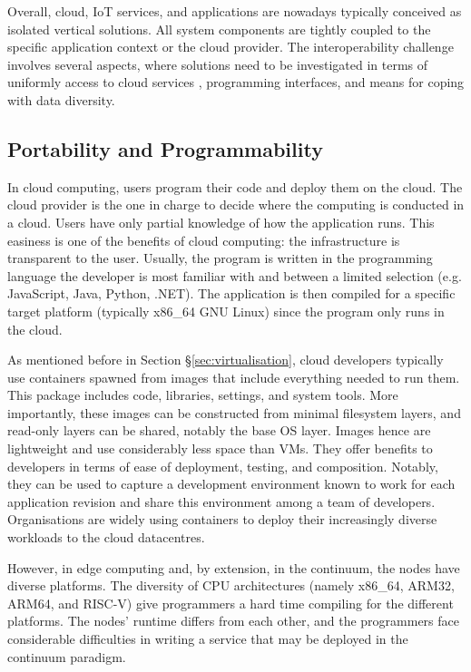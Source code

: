 Overall, cloud, IoT services, and applications are nowadays typically conceived as isolated vertical solutions. All system components are tightly coupled to the specific application context or the cloud provider. The interoperability challenge involves several aspects, where solutions need to be investigated in terms of uniformly access to cloud services \cite{grozev2014inter}, programming interfaces, and means for coping with data diversity.

\subsection{Portability and Programmability}

In cloud computing, users program their code and deploy them on the cloud. The cloud provider is the one in charge to decide where the computing is conducted in a cloud. Users have only partial knowledge of how the application runs. This easiness is one of the benefits of cloud computing: the infrastructure is transparent to the user. Usually, the program is written in the programming language the developer is most familiar with and between a limited selection (e.g. JavaScript, Java, Python, .NET). The application is then compiled for a specific target platform (typically x86\_64 GNU Linux) since the program only runs in the cloud.

As mentioned before in Section §\ref{sec:virtualisation}, cloud developers typically use containers spawned from images that include everything needed to run them. This package includes code, libraries, settings, and system tools. More importantly, these images can be constructed from minimal filesystem layers, and read-only layers can be shared, notably the base OS layer. Images hence are lightweight and use considerably less space than VMs. They offer benefits to developers in terms of ease of deployment, testing, and composition. Notably, they can be used to capture a development environment known to work for each application revision and share this environment among a team of developers. Organisations are widely using containers to deploy their increasingly diverse workloads to the cloud datacentres.

However, in edge computing and, by extension, in the continuum, the nodes have diverse platforms. The diversity of CPU architectures (namely x86\_64, ARM32, ARM64, and RISC-V) give programmers a hard time compiling for the different platforms. The nodes' runtime differs from each other, and the programmers face considerable difficulties in writing a service that may be deployed in the continuum paradigm.

